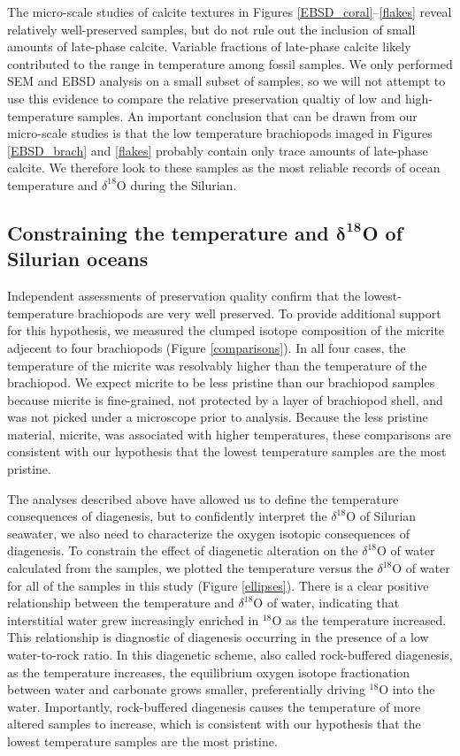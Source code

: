 \documentclass{article}
\newcommand{\deltao}{$\delta^{18}$}
\begin{document}
The micro-scale studies of calcite textures in Figures \ref{EBSD_coral}--\ref{flakes} reveal relatively well-preserved samples, but do not rule out the inclusion of small amounts of late-phase calcite. Variable fractions of late-phase calcite likely contributed to the range in temperature among fossil samples. We only performed SEM and EBSD analysis on a small subset of samples, so we will not attempt to use this evidence to compare the relative preservation qualtiy of low and high-temperature samples. An important conclusion that can be drawn from our micro-scale studies is that the low temperature brachiopods imaged in Figures \ref{EBSD_brach} and \ref{flakes} probably contain only trace amounts of late-phase calcite. We therefore look to these samples as the most reliable records of ocean temperature and \deltao O during the Silurian. 

\subsection{Constraining the temperature and $\mathbf{\delta^{18}}$O of Silurian oceans}

Independent assessments of preservation quality confirm that the lowest-temperature brachiopods are very well preserved. To provide additional support for this hypothesis, we measured the clumped isotope composition of the micrite adjecent to four brachiopods (Figure \ref{comparisons}). In all four cases, the temperature of the micrite was resolvably higher than the temperature of the brachiopod. We expect micrite to be less pristine than our brachiopod samples because micrite is fine-grained, not protected by a layer of brachiopod shell, and was not picked under a microscope prior to analysis. Because the less pristine material, micrite, was associated with higher temperatures, these comparisons are consistent with our hypothesis that the lowest temperature samples are the most pristine. 

The analyses described above have allowed us to define the temperature consequences of diagenesis, but to confidently interpret the \deltao O of Silurian seawater, we also need to characterize the oxygen isotopic consequences of diagenesis. To constrain the effect of diagenetic alteration on the \deltao O of water calculated from the samples, we plotted the temperature versus the \deltao O of water for all of the samples in this study (Figure \ref{ellipses}). There is a clear positive relationship between the temperature and \deltao O of water, indicating that interstitial water grew increasingly enriched in $^{18}$O as the temperature increased. This relationship is diagnostic of diagenesis occurring in the presence of a low water-to-rock ratio. In this diagenetic scheme, also called rock-buffered diagenesis, as the temperature increases, the equilibrium oxygen isotope fractionation between water and carbonate grows smaller, preferentially driving $^{18}$O into the water. Importantly, rock-buffered diagenesis causes the temperature of more altered samples to increase, which is consistent with our hypothesis that the lowest temperature samples are the most pristine. 
\end{document}
